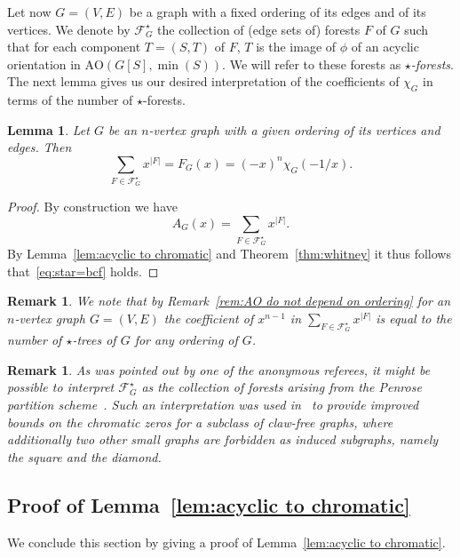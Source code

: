 \documentclass[a4paper,11pt,reqno]{amsart}
\newtheorem{lemma}[corollary]{Lemma}
\newtheorem{remark}[corollary]{Remark}
\numberwithin{equation}{section}
\begin{document}
Let now $G=(V,E)$ be a graph with a fixed ordering of its edges and of its vertices.
We denote by $\mathcal{F}^\star_G$ the collection of (edge sets of) forests $F$ of $G$ such that for each component $T=(S,T)$ of $F$, $T$ is the image of $\phi$ of an acyclic orientation in $\text{AO}(G[S],\min(S))$.
We will refer to these forests as \emph{$\star$-forests}.
The next lemma gives us our desired interpretation of the coefficients of $\chi_G$ in terms of the number of $\star$-forests.  
\begin{lemma}\label{lem:star forests}
Let $G$ be an $n$-vertex graph with a given ordering of its vertices and edges. Then
\begin{equation}\label{eq:star=bcf}
\sum_{F\in \mathcal{F}^\star_G} x^{|F|}=F_G(x)=(-x)^n\chi_G(-1/x).
\end{equation}
\end{lemma}
\begin{proof}
By construction we have
\begin{equation}
A_G(x)=\sum_{F\in \mathcal{F}^\star_G} x^{|F|}.    
\end{equation}
By Lemma~\ref{lem:acyclic to chromatic} and Theorem~\ref{thm:whitney} it thus follows that~\eqref{eq:star=bcf} holds. 
\end{proof}

\begin{remark}\label{rem:star trees do not depend on ordering}
We note that by Remark~\ref{rem:AO do not depend on ordering} for an $n$-vertex graph $G=(V,E)$ the coefficient of $x^{n-1}$ in $\sum_{F\in \mathcal{F}^\star_G} x^{|F|}$ is equal to the number of $\star$-trees of $G$ for any ordering of $G$.        
\end{remark}

\begin{remark}
As was pointed out by one of the anonymous referees, it might be possible to interpret $\mathcal{F}^\star_G$ as the collection of forests arising from the \emph{Penrose partition scheme}~\cite{ProcaccietalremarkBCF}. 
Such an interpretation was used in~\cite{fialho2026zero} to provide improved bounds on the chromatic zeros for a subclass of claw-free graphs, where additionally two other small graphs are forbidden as induced subgraphs, namely the square and the diamond.     
\end{remark}


\subsection{Proof of Lemma~\ref{lem:acyclic to chromatic}}
We conclude this section by giving a proof of Lemma~\ref{lem:acyclic to chromatic}.
\end{document}
